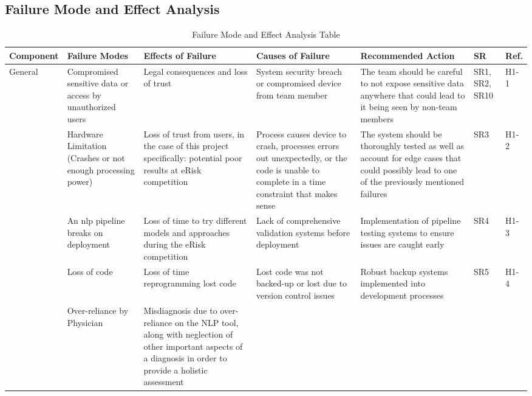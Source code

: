 \documentclass{article}
\begin{document}
\begin{landscape}
   \section{Failure Mode and Effect Analysis}
   \begin{longtable}{|p{}|p{}|p{}|p{}|p{}|p{}|p{}|}
       \caption{Failure Mode and Effect Analysis Table} \\
       \hline
       \textbf{Component} & \textbf{Failure Modes} & \textbf{Effects of Failure} & \textbf{Causes of Failure} & \textbf{Recommended Action} & \textbf{SR} & \textbf{Ref.} \\
       \hline
       \multirow{4}{*}{General}
       & Compromised sensitive data or access by unauthorized users
       & Legal consequences and loss of trust
       & System security breach or compromised device from team member
       & The team should be careful to not expose sensitive data anywhere that could lead to it being seen by non-team members
       & SR1, SR2, SR10
       & H1-1 \\
       \cline{2-7}
       & Hardware Limitation (Crashes or not enough processing power)
       & Loss of trust from users, in the case of this project specifically: potential poor results at eRisk competition
       & Process causes device to crash, processes errors out unexpectedly, or the code is unable to complete in a time constraint that makes sense
       & The system should be thoroughly tested as well as account for edge cases that could possibly lead to one of the previously mentioned failures
       & SR3
       & H1-2 \\
       \cline{2-7}
       & An nlp pipeline breaks on deployment
       & Loss of time to try different models and approaches during the eRisk competition
       & Lack of comprehensive validation systems before deployment
       & Implementation of pipeline testing systems to ensure issues are caught early
       & SR4
       & H1-3 \\
       \cline{2-7}
       \newpage \cline{2-7}
       & Loss of code
       & Loss of time reprogramming lost code
       & Lost code was not backed-up or lost due to version control issues
       & Robust backup systems implemented into development processes
       & SR5
       & H1-4 \\
       \cline{2-7}
       & Over-reliance by Physician
       & Misdiagnosis due to over-reliance on the NLP tool, along with neglection of other important aspects of a diagnosis in order to provide a holistic assessment

\end{longtable}
\end{landscape}
\end{document}
